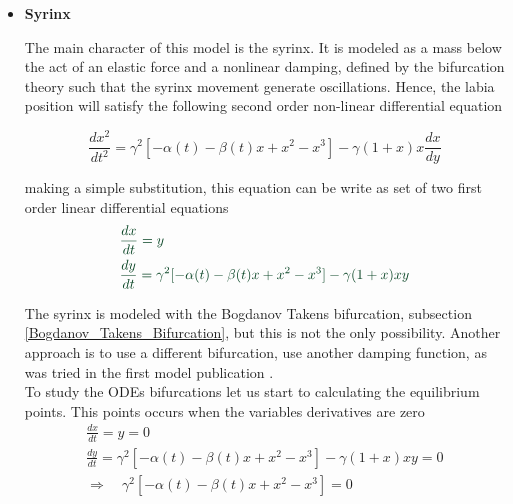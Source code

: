 \begin{itemize}
    \item \textbf{Syrinx}
    
    The main character of this model is the syrinx. It is modeled as a mass below the act of an elastic force and a nonlinear damping, defined by the bifurcation theory such that the syrinx movement generate oscillations. Hence, the labia position will satisfy the following second order non-linear differential equation 
    
    \begin{equation*}
        \frac{dx^2}{dt^2} = \gamma^2[-\alpha (t)-\beta (t) x  + x^2 - x^3] - \gamma (1+ x )x\frac{dx}{dy}
    \end{equation*}
    
    making a simple substitution, this equation can be write as set of two first order linear differential equations
    \begin{align}\label{syrinx_edos}
    &\color{mygreen} \frac{dx}{dt} = y\nonumber\\
    &\color{mygreen} \frac{dy}{dt} = \gamma^2[-\alpha (t)-\beta (t) x  + x^2 - x^3] - \gamma (1+ x )xy
\end{align}

The syrinx is modeled with the Bogdanov Takens bifurcation, subsection \ref{Bogdanov_Takens_Bifurcation}, but this is not the only possibility. Another approach is to use a different bifurcation, use another damping function, as was tried in the first model publication \cite{syrinx_first_model}.\\ 

To study the ODEs bifurcations let us start to calculating the equilibrium points. This points occurs when the variables derivatives are zero
\begin{gather*}
    \frac{dx}{dt} = y = 0\\
    \frac{dy}{dt} = \gamma^2[-\alpha (t)-\beta (t) x  + x^2 - x^3] - \gamma (1+ x )xy = 0\\
    \Rightarrow \quad \gamma^2[-\alpha (t)-\beta (t) x  + x^2 - x^3] = 0 
\end{gather*}


\end{itemize}
